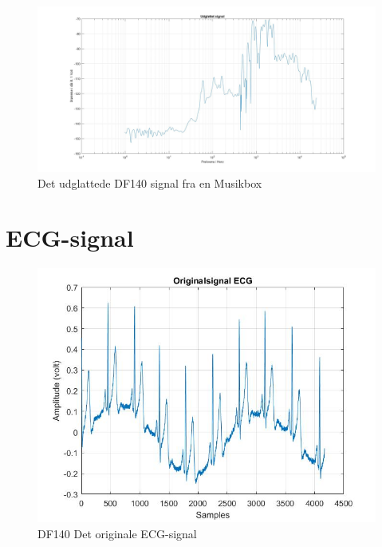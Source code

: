 \begin{figure}[H]
	\centering
	\includegraphics[width=140mm]{figures/Musikbox/udglattet.jpg}
	\caption{Det udglattede DF140 signal fra en Musikbox}
	\label{fig:Musikbox udglattet}
\end{figure}

\section{ECG-signal}
\begin{figure}[H]
	\centering
	\includegraphics[width=140mm]{figures/ECG/original.jpg}
	\caption{DF140 Det originale ECG-signal}
	\label{fig:ECG original}
\end{figure}

